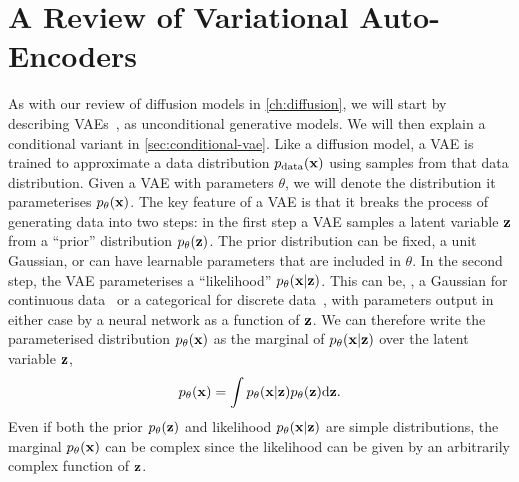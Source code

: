 \section{A Review of Variational Auto-Encoders}
\label{sec:vae}
As with our review of diffusion models in \cref{ch:diffusion}, we will start by describing VAEs~\citep{kingma2013auto,rezende2014stochastic}, as unconditional generative models. We will then explain a conditional variant in \cref{sec:conditional-vae}. Like a diffusion model, a VAE is trained to approximate a data distribution $p_{\rm{data}}({\mathbf{x}})$ using samples from that data distribution. Given a VAE with parameters $\theta$, we will denote the distribution it parameterises $p_\theta({\mathbf{x}})$. The key feature of a VAE is that it breaks the process of generating data into two steps: in the first step a VAE samples a latent variable ${\mathbf{z}}$ from a ``prior'' distribution $p_\theta({\mathbf{z}})$. The prior distribution can be fixed, \eg a unit Gaussian, or can have learnable parameters that are included in $\theta$. In the second step, the VAE parameterises a ``likelihood'' $p_\theta({\mathbf{x}}|{\mathbf{z}})$. This can be, \eg, a Gaussian for continuous data~\citep{kingma2013auto} or a categorical for discrete data~\citep{child2020very}, with parameters output in either case by a neural network as a function of ${\mathbf{z}}$. We can therefore write the parameterised distribution $p_\theta({\mathbf{x}})$ as the marginal of $p_\theta({\mathbf{x}}|{\mathbf{z}})$ over the latent variable ${\mathbf{z}}$,
\begin{equation} \label{eq:vae-marginal}
p_\theta({\mathbf{x}}) = \int p_\theta({\mathbf{x}}|{\mathbf{z}})p_\theta({\mathbf{z}}) \mathrm{d}{\mathbf{z}}.
\end{equation}
Even if both the prior $p_\theta({\mathbf{z}})$ and likelihood $p_\theta({\mathbf{x}}|{\mathbf{z}})$ are simple distributions, the marginal $p_\theta({\mathbf{x}})$ can be complex since the likelihood can be given by an arbitrarily complex function of ${\mathbf{z}}$.

